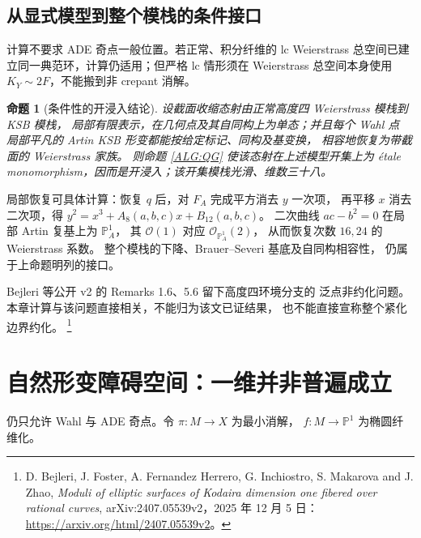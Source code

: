 \documentclass[UTF8,fontset=fandol,zihao=-4,oneside,openany]{ctexbook}
\theoremstyle{cjkplain}
\newtheorem{proposition}[theorem]{命题}
\numberwithin{equation}{chapter}
\begin{document}
\subsection{从显式模型到整个模栈的条件接口}

计算不要求 ADE 奇点一般位置。若正常、积分纤维的 lc Weierstrass
总空间已建立同一典范环，计算仍适用；但严格 lc 情形须在
Weierstrass 总空间本身使用 $K_Y\sim2F$，不能搬到非 crepant 消解。

\begin{proposition}[条件性的开浸入结论]
\label{ALG:moduliconditional}
设截面收缩态射由正常高度四 Weierstrass 模栈到 KSB 模栈，
局部有限表示，在几何点及其自同构上为单态；并且每个 Wahl 点
局部平凡的 Artin KSB 形变都能按给定标记、同构及基变换，
相容地恢复为带截面的 Weierstrass 家族。
则命题 \ref{ALG:QG} 使该态射在上述模型开集上为
étale monomorphism，因而是开浸入；该开集模栈光滑、维数三十八。
\end{proposition}

局部恢复可具体计算：恢复 $q$ 后，对 $F_A$ 完成平方消去 $y$ 一次项，
再平移 $x$ 消去二次项，得
$y^2=x^3+A_8(a,b,c)x+B_{12}(a,b,c)$。
二次曲线 $ac-b^2=0$ 在局部 Artin 复基上为 $\mathbb P^1_A$，
其 $\mathcal O(1)$ 对应 $\mathcal O_{\mathbb P^1_A}(2)$，
从而恢复次数 $16,24$ 的 Weierstrass 系数。
整个模栈的下降、Brauer--Severi 基底及自同构相容性，
仍属于上命题明列的接口。

Bejleri 等公开 v2 的 Remarks 1.6、5.6 留下高度四环境分支的
泛点非约化问题。本章计算与该问题直接相关，不能归为该文已证结果，
也不能直接宣称整个紧化边界约化。
\footnote{D. Bejleri, J. Foster, A. Fernandez Herrero, G. Inchiostro,
S. Makarova and J. Zhao,
\emph{Moduli of elliptic surfaces of Kodaira dimension one fibered over rational curves},
arXiv:2407.05539v2，2025 年 12 月 5 日：
\url{https://arxiv.org/html/2407.05539v2}。
}

\section{自然形变障碍空间：一维并非普遍成立}

仍只允许 Wahl 与 ADE 奇点。令 $\pi:M\to X$ 为最小消解，
$f:M\to\mathbb P^1$ 为椭圆纤维化。
\end{document}
